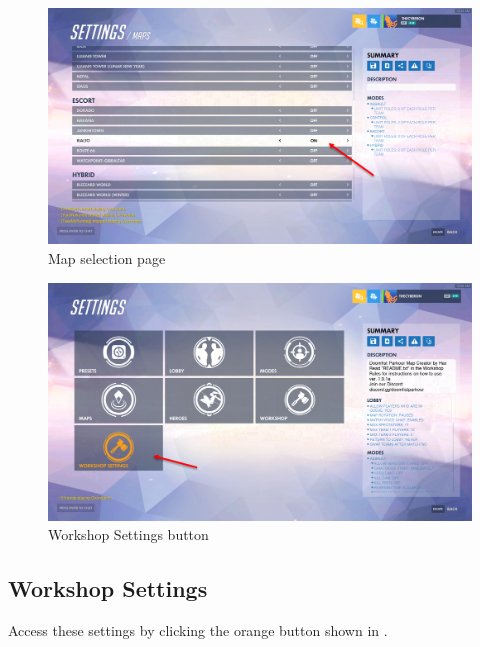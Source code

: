 \documentclass[12pt,a4paper]{article}
\begin{document}
        \begin{figure}[ht]
            \centering
            \includegraphics[width=\textwidth,height=\textheight,keepaspectratio]{Picture2.png}
            \caption{Map selection page}
            \label{fig:Picture2}
        \end{figure}
        
        \begin{figure}[ht]
            \centering
            \includegraphics[width=\textwidth,height=\textheight,keepaspectratio]{Picture4.png}
            \caption{Workshop Settings button}
            \label{fig:Picture4}
        \end{figure}
        \clearpage
    
    \subsection{Workshop Settings}
        Access these settings by clicking the orange  button shown in .
        
\end{document}
